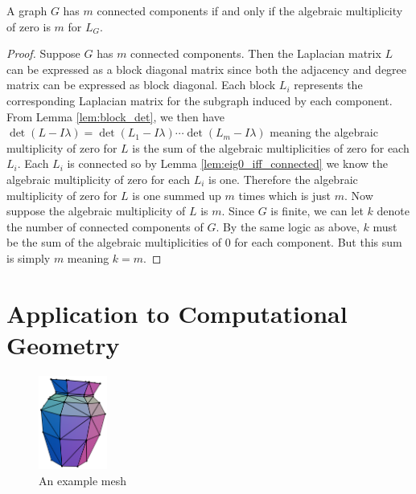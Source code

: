 \documentclass[11pt]{article}
\begin{document}
\begin{theorem}
    \label{thm:main_thm}
    A graph $G$ has $m$ connected components if and only if the algebraic multiplicity of zero is $m$ for $L_G$.
\end{theorem}

\begin{proof}
    Suppose $G$ has $m$ connected components. Then the Laplacian matrix $L$ can be expressed as a block diagonal matrix since both the adjacency and degree matrix can be expressed as block diagonal. Each block $L_i$ represents the corresponding Laplacian matrix for the subgraph induced by each component. From Lemma \ref{lem:block_det}, we then have $\det(L - I \lambda) = \det(L_1 - I \lambda) \cdots \det(L_m - I \lambda)$ meaning the algebraic multiplicity of zero for $L$ is the sum of the algebraic multiplicities of zero for each $L_i$. Each $L_i$ is connected so by Lemma \ref{lem:eig0_iff_connected} we know the algebraic multiplicity of zero for each $L_i$ is one. Therefore the algebraic multiplicity of zero for $L$ is one summed up $m$ times which is just $m$. Now suppose the algebraic multiplicity of $L$ is $m$. Since $G$ is finite, we can let $k$ denote the number of connected components of $G$. By the same logic as above, $k$ must be the sum of the algebraic multiplicities of $0$ for each component. But this sum is simply $m$ meaning $k = m$.
\end{proof}

\section{Application to Computational Geometry}

\captionsetup{justification=centering,singlelinecheck=false}
\begin{figure}
    \vspace{-2.1cm}
    \begin{center}
        \includegraphics[width=0.20\textwidth]{vase_all_cropped.png}
    \end{center}
    \caption{An example mesh}
    \label{fig:vase}
\end{figure}
\end{document}
